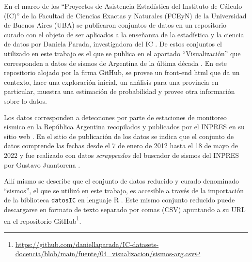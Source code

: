 \documentclass[a4paper]{report}
\begin{document}
En el marco de los ``Proyectos de Asistencia Estadística del Instituto de Cálculo (IC)'' de la Facultad de Ciencias Exactas y Naturales (FCEyN) de la Universidad de Buenos Aires (UBA) se publicaron conjuntos de datos en un repositorio curado con el objeto de ser aplicados a la enseñanza de la estadística y la ciencia de datos por Daniela Parada, investigadora del IC \cite{noauthor_ic-datasets-docencia_nodate}.
De estos conjuntos el utilizado en este trabajo es el que se publica en el apartado ``Visualización'' que corresponden a datos de sismos de Argentina de la última década \cite{daniela_parada_ic-datasets-docencia_nodate}. 
En este repositorio alojado por la firma GitHub, se provee un front-end html que da un contexto, hace una exploración inicial, un análisis para una provincia en particular, muestra una estimación de probabilidad y provee otra información sobre lo datos.

Los datos corresponden a detecciones por parte de estaciones de monitoreo sísmico en la República Argentina recopilados y publicados por el INPRES en su sitio web \cite{noauthor_buscador_nodate}.
En el sitio de publicación de los datos se indica que el conjunto de datos comprende las fechas desde el 7 de enero de 2012 hasta el 18 de mayo de 2022 y fue realizado con datos \emph{scrappeados} del buscador de sismos del INPRES por Gustavo Juantorena \cite[sección 4.1]{daniela_parada_ic-datasets-docencia_nodate}. 

Allí mismo se describe que el conjunto de datos reducido y curado denominado ``sismos'', el que se utilizó en este trabajo, es accesible a través de la importación de la biblioteca \texttt{datosIC} en lenguaje R  \cite[sección 5.1.1]{daniela_parada_ic-datasets-docencia_nodate}.
Este mismo conjunto reducido puede descargarse en formato de texto separado por comas (CSV) apuntando a su URL en el repositorio GitHub\footnote{\url{https://github.com/daniellaparada/IC-datasets-docencia/blob/main/fuente/04_visualizacion/sismos-arg.csv}}.
\end{document}
